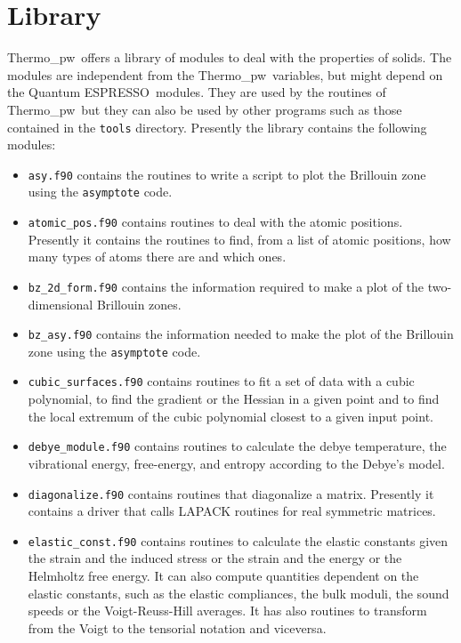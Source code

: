 \documentclass[12pt,a4paper,twoside]{report}
\def\qe{{\sc Quantum ESPRESSO}}
\def\tpw{{\sc Thermo}\_{\sc pw}}
\begin{document}
\newpage
{\color{dark-blue}\chapter{Library}}
\color{black}

\tpw\ offers a library of modules to deal with the properties of solids. The 
modules are independent from the \tpw\ variables, but might
depend on the \qe\ modules. They are used by the routines of \tpw\ 
but they can also be used by other programs such as those contained
in the \texttt{tools} directory. Presently the library contains the
following modules:

\begin{itemize}

\item
\texttt{asy.f90} contains the routines to write a script to plot the
Brillouin zone using the \texttt{asymptote} code.

\item
\texttt{atomic\_pos.f90} contains routines to deal with the atomic positions.
Presently it contains the routines to find, from a list of atomic positions,
how many types of atoms there are and which ones.

\item
\texttt{bz\_2d\_form.f90} contains the information required to make a
plot of the two-dimensional Brillouin zones.

\item
\texttt{bz\_asy.f90} contains the information needed to make the plot       
of the Brillouin zone using the \texttt{asymptote} code.      

\item
\texttt{cubic\_surfaces.f90} contains routines to fit a set of data
with a cubic polynomial, to find the gradient or the Hessian in 
a given point and to find the local extremum of the cubic polynomial
closest to a given input point. 

\item
\texttt{debye\_module.f90} contains routines to calculate the debye 
temperature, the vibrational energy, free-energy, and entropy according
to the Debye's model.

\item
\texttt{diagonalize.f90} contains routines that diagonalize a matrix.
Presently it contains a driver that calls LAPACK routines
for real symmetric matrices.

\item
\texttt{elastic\_const.f90} contains routines to calculate the elastic
constants given the strain and the induced stress or the strain and
the energy or the Helmholtz free energy. It can also compute
quantities dependent on the elastic constants, such as the elastic 
compliances, the bulk moduli, the sound speeds or the Voigt-Reuss-Hill 
averages. It has also routines to transform from the Voigt to the 
tensorial notation and viceversa.


\end{itemize}
\end{document}
